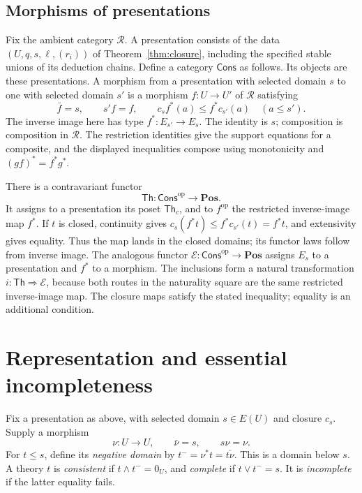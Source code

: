 \documentclass[11pt]{article}
\theoremstyle{definition}
\newcommand{\R}{\mathscr R}
\newcommand{\Pos}{\mathbf{Pos}}
\newcommand{\Th}{\mathsf{Th}}
\newcommand{\Cons}{\mathsf{Cons}}
\begin{document}
\subsection{Morphisms of presentations}

Fix the ambient category $\R$. A presentation consists of the data
$(U,q,s,\ell,(r_i))$ of Theorem~\ref{thm:closure}, including the specified
stable unions of its deduction chains. Define a category $\Cons$ as follows.
Its objects are these presentations. A morphism from a presentation with
selected domain $s$ to one with selected domain $s'$ is a morphism
$f:U\to U'$ of $\R$ satisfying
\[
 \bar f=s,\qquad s'f=f,
 \qquad c_s f^*(a)\le f^*c_{s'}(a)\quad(a\le s').
\]
The inverse image here has type $f^*:E_{s'}\to E_s$. The identity is $s$;
composition is composition in $\R$. The restriction identities give the
support equations for a composite, and the displayed inequalities compose
using monotonicity and $(gf)^*=f^*g^*$.

There is a contravariant functor
\[
 \Th:\Cons^{\mathrm{op}}\longrightarrow\Pos.
\]
It assigns to a presentation its poset $\Th_c$, and to $f^{\mathrm{op}}$
the restricted inverse-image map $f^*$. If $t$ is closed, continuity gives
$c_s(f^*t)\le f^*c_{s'}(t)=f^*t$, and extensivity gives equality. Thus the
map lands in the closed domains; its functor laws follow from inverse image.
The analogous functor $\mathcal E:\Cons^{\mathrm{op}}\to\Pos$ assigns
$E_s$ to a presentation and $f^*$ to a morphism. The inclusions form a natural
transformation $i:\Th\Rightarrow\mathcal E$, because both routes in the
naturality square are the same restricted inverse-image map. The closure
maps satisfy the stated inequality; equality is an additional condition.

\section{Representation and essential incompleteness}

Fix a presentation as above, with selected domain $s\in E(U)$ and closure
$c_s$. Supply a morphism
\begin{equation}\label{eq:negative-operation}
 \nu:U\to U,\qquad\bar\nu=s,\qquad s\nu=\nu.
\end{equation}
For $t\le s$, define its \emph{negative domain} by
$t^-=\nu^*t=\overline{t\nu}$. This is a domain below $s$.
A theory $t$ is \emph{consistent} if $t\wedge t^-=0_U$, and
\emph{complete} if $t\vee t^-=s$. It is \emph{incomplete} if the latter
equality fails.
\end{document}
